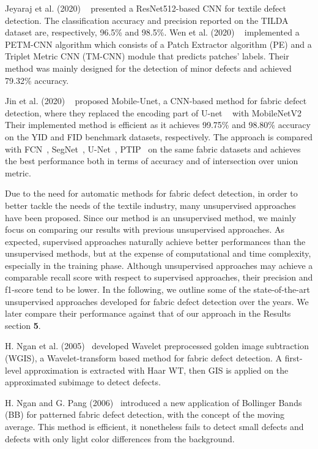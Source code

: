 \documentclass[3p,,preprint,review,12pt]{elsarticle}
\begin{document}
Jeyaraj et al. (2020) \unskip~\cite{Jeyaraj2020EffectiveTQ} presented a ResNet512-based CNN for textile defect detection. The classification accuracy and precision reported on the TILDA dataset are, respectively,  96.5\% and 98.5\%. 
Wen et al. (2020) \unskip~\cite{Wen2020CNNbasedMF} implemented a PETM-CNN algorithm which consists of a Patch Extractor algorithm (PE) and a Triplet Metric CNN (TM-CNN) module that predicts patches’ labels. Their method was mainly designed for the detection of minor defects and achieved 79.32\% accuracy.

Jin et al. (2020) \unskip~\cite{981091:21201220} proposed Mobile-Unet, a CNN-based method for fabric defect detection, where they replaced the encoding part of U-net \unskip~\cite{Falk2018UNetDL} with MobileNetV2 \unskip~\cite{Sandler2018MobileNetV2IR} Their implemented method is efficient as it achieves 99.75\% and 98.80\% accuracy on the YID and FID benchmark datasets, respectively. The approach is compared with FCN\unskip~\cite{981091:21201181}, SegNet\unskip~\cite{981091:21201173}, U-Net\unskip~\cite{981091:21201172}, PTIP\unskip~\cite{981091:21201221} on the same fabric datasets and achieves the best performance both in terms of accuracy and of intersection over union metric.

Due to the need for automatic methods for fabric defect detection, in order to better tackle the needs of the textile industry, many unsupervised approaches have been proposed. Since our method is an unsupervised method, we mainly focus on comparing our results with previous unsupervised approaches. As expected, supervised approaches naturally achieve better performances than the unsupervised methods, but at the expense of computational and time complexity, especially in the training phase. Although unsupervised approaches may achieve a comparable recall score with respect to supervised approaches, their precision and f1-score tend to be lower. 
In the following, we outline some of the state-of-the-art unsupervised approaches developed for fabric defect detection over the years. We later compare their performance against that of our approach in the Results section \textbf{5}.


H. Ngan et al. (2005)\unskip~\cite{981091:21201168}  developed Wavelet preprocessed golden image subtraction (WGIS), a Wavelet-transform based method for fabric defect detection. A first-level approximation is extracted with Haar WT, then GIS is applied on the approximated subimage to detect defects. 

H. Ngan and G. Pang (2006)\unskip~\cite{981091:21201212} introduced a new application of Bollinger Bands (BB) for patterned fabric defect detection, with the concept of the moving average. This method is efficient, it nonetheless fails to detect small defects and defects with only light color differences from the background.
\end{document}
